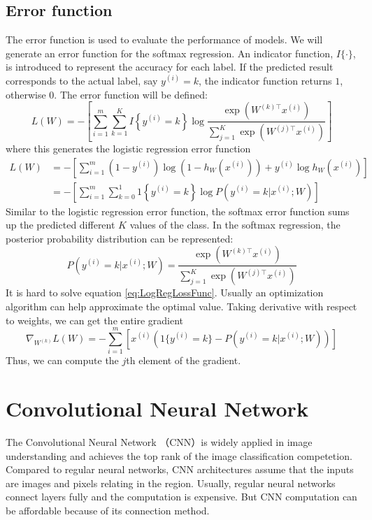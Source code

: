 \subsection{Error function}
The error function is used to evaluate the performance of models. We will generate an error function for the softmax regression. An indicator function, $I\{\cdot\}$, is introduced to represent the accuracy for each label. If the predicted result corresponds to the actual label, say $y^{(i)} = k$, the indicator function returns $1$, otherwise $0$. The error function will be defined:
\begin{equation}\label{eq:LogLossFunc}
L(W) = - \left[ \sum_{i=1}^{m} \sum_{k=1}^{K}  I\left\{y^{(i)} = k\right\} \log \frac{\exp(W^{(k)\top} x^{(i)})}{\sum_{j=1}^K \exp(W^{(j)\top} x^{(i)})}\right]
\end{equation}
where this generates the logistic regression error function
\begin{align}\label{eq:LogRegLossFunc}
L(W) &= - \left[ \sum_{i=1}^m   (1-y^{(i)}) \log (1-h_W(x^{(i)})) + y^{(i)} \log h_W(x^{(i)}) \right] \\
&= - \left[ \sum_{i=1}^{m} \sum_{k=0}^{1} 1\left\{y^{(i)} = k\right\} \log P(y^{(i)} = k | x^{(i)} ; W) \right]
\end{align}
Similar to the logistic regression error function, the softmax error function sums up the predicted different $K$ values of the class. In the softmax regression, the posterior probability distribution can be represented:
\begin{equation}\label{eq:PostProbDis}
P(y^{(i)} = k | x^{(i)} ; W) = \frac{\exp(W^{(k)\top} x^{(i)})}{\sum_{j=1}^K \exp(W^{(j)\top} x^{(i)}) }
\end{equation}
It is hard to solve equation \ref{eq:LogRegLossFunc}. Usually an optimization algorithm can help approximate the optimal value. Taking derivative with respect to weights, we can get the entire gradient 
\begin{equation}\label{eq:PartDer}
\nabla_{W^{(k)}} L(W) = - \sum_{i=1}^{m}{ \left[ x^{(i)} \left( 1\{ y^{(i)} = k\}  - P(y^{(i)} = k | x^{(i)}; W) \right) \right]  }
\end{equation}
Thus, we can compute the $j$th element of the gradient.

\section{Convolutional Neural Network}

The Convolutional Neural Network\citep{lecun1998gradient} （CNN）is widely applied in image understanding and achieves the top rank of the image classification competetion\citep{krizhevsky2012imagenet}. Compared to regular neural networks, CNN architectures assume that the inputs are images and pixels relating in the region. Usually, regular neural networks connect layers fully and the computation is expensive. But CNN computation can be affordable because of its connection method.

